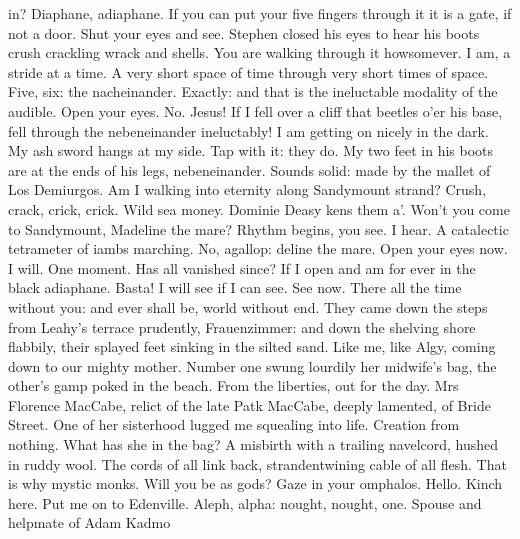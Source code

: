 \documentclass{article}
\begin{document}
in? Diaphane, adiaphane. If you can put your five fingers through it it
is a gate, if not a door. Shut your eyes and see.
Stephen closed his eyes to hear his boots crush crackling wrack and
shells. You are walking through it howsomever. I am, a stride at a time.
A very short space of time through very short times of space. Five, six:
the nacheinander. Exactly: and that is the ineluctable modality of the
audible. Open your eyes. No. Jesus! If I fell over a cliff that beetles
o’er his base, fell through the nebeneinander ineluctably! I am
getting on nicely in the dark. My ash sword hangs at my side. Tap with
it: they do. My two feet in his boots are at the ends of his legs,
nebeneinander. Sounds solid: made by the mallet of Los Demiurgos. Am
I walking into eternity along Sandymount strand? Crush, crack, crick,
crick. Wild sea money. Dominie Deasy kens them a’.
      Won’t you come to Sandymount,
      Madeline the mare?
Rhythm begins, you see. I hear. A catalectic tetrameter of iambs
marching. No, agallop: deline the mare.
Open your eyes now. I will. One moment. Has all vanished since? If I
open and am for ever in the black adiaphane. Basta! I will see if I can
see.
See now. There all the time without you: and ever shall be, world
without end.
They came down the steps from Leahy’s terrace prudently, Frauenzimmer:
and down the shelving shore flabbily, their splayed feet sinking in
the silted sand. Like me, like Algy, coming down to our mighty mother.
Number one swung lourdily her midwife’s bag, the other’s gamp poked
in the beach. From the liberties, out for the day. Mrs Florence MacCabe,
relict of the late Patk MacCabe, deeply lamented, of Bride Street. One
of her sisterhood lugged me squealing into life. Creation from nothing.
What has she in the bag? A misbirth with a trailing navelcord, hushed
in ruddy wool. The cords of all link back, strandentwining cable of
all flesh. That is why mystic monks. Will you be as gods? Gaze in your
omphalos. Hello. Kinch here. Put me on to Edenville. Aleph, alpha:
nought, nought, one.
Spouse and helpmate of Adam Kadmo
\end{document}
